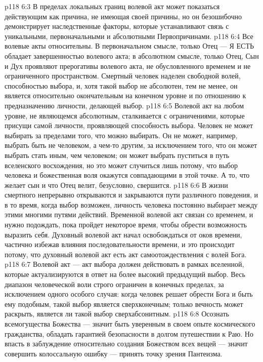 \vs p118 6:3 \pc В пределах локальных границ волевой акт может показаться действующим как причина, не имеющая своей причины, но он безошибочно демонстрирует наследственные факторы, которые устанавливают связь с уникальными, первоначальными и абсолютными Первопричинами.
\vs p118 6:4 Все волевые акты относительны. В первоначальном смысле, только Отец --- Я ЕСТЬ обладает завершенностью волевого акта; в абсолютном смысле, только Отец, Сын и Дух проявляют прерогативы волевого акта, не обусловленного временем и не ограниченного пространством. Смертный человек наделен свободной волей, способностью выбора, и, хотя такой выбор не абсолютен, тем не менее, он является относительно окончательным на конечном уровне и по отношению к предназначению личности, делающей выбор.
\vs p118 6:5 Волевой акт на любом уровне, не являющемся абсолютным, сталкивается с ограничениями, которые присущи самой личности, проявляющей способность выбора. Человек не может выбирать за пределами того, что можно выбирать. Он не может, например, выбрать быть не человеком, а чем\hyp{}то другим, за исключением того, что он может выбрать стать иным, чем человеком; он может выбрать пуститься в путь вселенского восхождения, но это может случиться лишь потому, что выбор человека и божественная воля окажутся совпадающими в этой точке. А то, что желает сын и что Отец велит, безусловно, свершится.
\vs p118 6:6 В жизни смертного непрерывно открываются и закрываются пути различного поведения, и в то время, когда выбор возможен, личность человека постоянно выбирает между этими многими путями действий. Временной волевой акт связан со временем, и нужно подождать, пока пройдет некоторое время, чтобы обрести возможность выразить себя. Духовный волевой акт начал освобождаться от оков времени, частично избежав влияния последовательности времени, и это происходит потому, что духовный волевой акт есть акт самоотождествления с волей Бога.
\vs p118 6:7 Волевой акт --- акт выбора должен действовать в рамках вселенной, которые актуализируются в ответ на более высокий предыдущий выбор. Весь диапазон человеческой воли строго ограничен в конечных пределах, за исключением одного особого случая: когда человек решает обрести Бога и быть ему подобным, такой выбор является сверхконечным; только вечность может раскрыть, является ли такой выбор сверхабсонитным.
\vs p118 6:8 \pc Осознать всемогущества Божества --- значит быть уверенным в своем опыте космического гражданства, обладать гарантией безопасности в долгом путешествии к Раю. Но впасть в заблуждение относительно создания Божеством всех вещей --- значит совершить колоссальную ошибку --- принять точку зрения Пантеизма.
